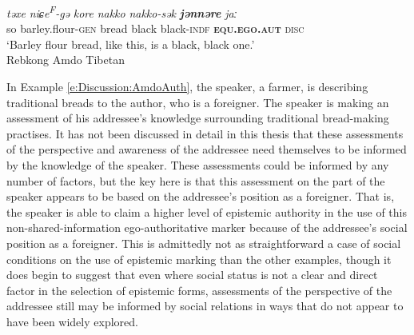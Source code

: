 \begin{exe}
    \ex \label{e:Discussion:AmdoAuth}
    \gll \textit{təxe} \textit{niɕe\textsuperscript{F}-gə} \textit{kore} \textit{nakko} \textit{nakko-sək} \textbf{\textit{jənnəre}} \textit{jaː} \\
    so barley.flour-\textsc{gen} bread black black-\textsc{indf} \textbf{\textsc{equ.ego.aut}} \textsc{disc} \\
    \glt `Barley flour bread, like this, is a black, black one.' \\
    Rebkong Amdo Tibetan \cite[Tibetic:PRC,][300]{Simon2021}
\end{exe}

In Example \ref{e:Discussion:AmdoAuth}, the speaker, a farmer, is describing traditional breads to the author, who is a foreigner. The speaker is making an assessment of his addressee's knowledge surrounding traditional bread-making practises. It has not been discussed in detail in this thesis that these assessments of the perspective and awareness of the addressee need themselves to be informed by the knowledge of the speaker. These assessments could be informed by any number of factors, but the key here is that this assessment on the part of the speaker appears to be based on the addressee's position as a foreigner. That is, the speaker is able to claim a higher level of epistemic authority in the use of this non-shared-information ego-authoritative marker because of the addressee's social position as a foreigner. This is admittedly not as straightforward a case of social conditions on the use of epistemic marking than the other examples, though it does begin to suggest that even where social status is not a clear and direct factor in the selection of epistemic forms, assessments of the perspective of the addressee still may be informed by social relations in ways that do not appear to have been widely explored.

